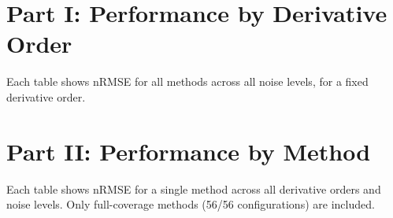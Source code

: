\documentclass[10pt]{article}
\begin{document}
\section{Part I: Performance by Derivative Order}

Each table shows nRMSE for all methods across all noise levels, for a fixed derivative order.


\clearpage


\section{Part II: Performance by Method}

Each table shows nRMSE for a single method across all derivative orders and noise levels. Only full-coverage methods (56/56 configurations) are included.

\end{document}
